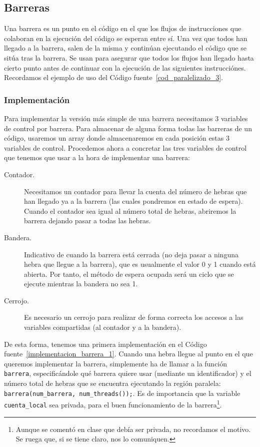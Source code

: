\subsection{Barreras}
Una barrera es un punto en el código en el que los flujos de instrucciones que colaboran en la ejecución del código se esperan entre sí. Una vez que todos han llegado a la barrera, salen de la misma y continúan ejecutando el código que se sitúa tras la barrera. Se usan para asegurar que todos los flujos han llegado hasta cierto punto antes de continuar con la ejecución de las siguientes instrucciónes. Recordamos el ejemplo de uso del Código fuente~\ref{cod_paralelizado_3}.

\subsubsection{Implementación}
Para implementar la versión más simple de una barrera necesitamos 3 variables de control por barrera. Para almacenar de alguna forma todas las barreras de un código, usaremos un array donde almacenaremos en cada posición estas 3 variables de control. Procedemos ahora a concretar las tres variables de control que tenemos que usar a la hora de implementar una barrera:
\begin{description}
    \item [Contador.] Necesitamos un contador para llevar la cuenta del número de hebras que han llegado ya a la barrera (las cuales pondremos en estado de espera). Cuando el contador sea igual al número total de hebras, abriremos la barrera dejando pasar a todas las hebras.
    \item [Bandera.] Indicativo de cuando la barrera está cerrada (no deja pasar a ninguna hebra que llegue a la barrera), que es usualmente el valor 0 y 1 cuando está abierta. Por tanto, el método de espera ocupada será un ciclo que se ejecute mientras la bandera no sea 1.
    \item [Cerrojo.] Es necesario un cerrojo para realizar de forma correcta los accesos a las variables compartidas (al contador y a la bandera).
\end{description}
De esta forma, tenemos una primera implementación en el Código fuente~\ref{implementacion_barrera_1}. Cuando una hebra llegue al punto en el que queremos implementar la barrera, simplemente ha de llamar a la función \verb|barrera|, especificándole qué barrera quiere usar (mediante un identificador) y el número total de hebras que se encuentra ejecutando la región paralela: \verb|barrera(num_barrera, num_threads());|. Es de importancia que la variable \verb|cuenta_local| sea privada, para el buen funcionamiento de la barrera\footnote{Aunque se comentó en clase que debía ser privada, no recordamos el motivo. Se ruega que, si se tiene claro, nos lo comuniquen.}.

